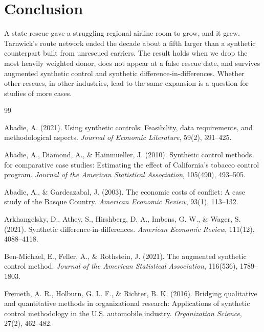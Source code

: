 \documentclass[12pt]{article}
\begin{document}
\section{Conclusion}

A state rescue gave a struggling regional airline room to grow, and it grew. Tarnwick's route network ended the decade about a fifth larger than a synthetic counterpart built from unrescued carriers. The result holds when we drop the most heavily weighted donor, does not appear at a false rescue date, and survives augmented synthetic control and synthetic difference-in-differences. Whether other rescues, in other industries, lead to the same expansion is a question for studies of more cases.

\begin{thebibliography}{99}
\setlength{\itemsep}{2pt}

Abadie, A. (2021). Using synthetic controls: Feasibility, data requirements, and methodological aspects. \textit{Journal of Economic Literature}, 59(2), 391--425.

Abadie, A., Diamond, A., \& Hainmueller, J. (2010). Synthetic control methods for comparative case studies: Estimating the effect of California's tobacco control program. \textit{Journal of the American Statistical Association}, 105(490), 493--505.

Abadie, A., \& Gardeazabal, J. (2003). The economic costs of conflict: A case study of the Basque Country. \textit{American Economic Review}, 93(1), 113--132.

Arkhangelsky, D., Athey, S., Hirshberg, D. A., Imbens, G. W., \& Wager, S. (2021). Synthetic difference-in-differences. \textit{American Economic Review}, 111(12), 4088--4118.

Ben-Michael, E., Feller, A., \& Rothstein, J. (2021). The augmented synthetic control method. \textit{Journal of the American Statistical Association}, 116(536), 1789--1803.

Fremeth, A. R., Holburn, G. L. F., \& Richter, B. K. (2016). Bridging qualitative and quantitative methods in organizational research: Applications of synthetic control methodology in the U.S. automobile industry. \textit{Organization Science}, 27(2), 462--482.

\end{thebibliography}
\end{document}
